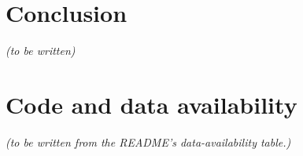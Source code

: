 \documentclass[final,5p,times,number]{elsarticle}
\begin{document}




\section{Conclusion}\label{sec:conclusions}
\emph{(to be written)}

\section*{Code and data availability}
\emph{(to be written from the README's data-availability table.)}

\nocite{*}


\end{document}
